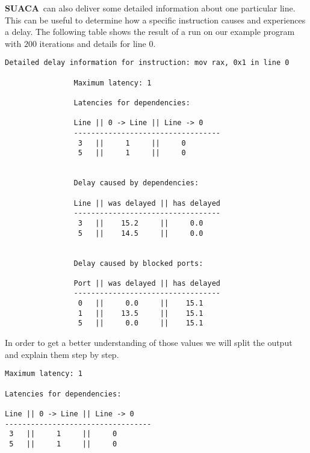 \documentclass[a4paper,12pt,titlepage, twoside]{report}
\newcommand{\suaca}{\textbf{SUACA}}
\begin{document}
\suaca\ can also deliver some detailed information about one particular line. This can be useful to determine how a specific instruction causes and experiences a delay. The following table shows the result of a run on our example program with $200$ iterations and details for line $0$.

\begin{mdframed}[backgroundcolor=light-gray, roundcorner=10pt,leftmargin=1, rightmargin=1, innerleftmargin=15, innertopmargin=15,innerbottommargin=15, outerlinewidth=1, linecolor=light-gray]
\begin{center}
\begin{BVerbatim}[fontsize=\scriptsize]
Detailed delay information for instruction: mov rax, 0x1 in line 0

                Maximum latency: 1
                
                Latencies for dependencies:
                
                Line || 0 -> Line || Line -> 0
                ----------------------------------
                 3   ||     1     ||     0
                 5   ||     1     ||     0
                
                
                Delay caused by dependencies:
                
                Line || was delayed || has delayed
                ----------------------------------
                 3   ||    15.2     ||     0.0
                 5   ||    14.5     ||     0.0
                
                
                Delay caused by blocked ports:
                
                Port || was delayed || has delayed
                ----------------------------------
                 0   ||     0.0     ||    15.1
                 1   ||    13.5     ||    15.1
                 5   ||     0.0     ||    15.1
\end{BVerbatim}
\end{center}
\end{mdframed}

In order to get a better understanding of those values we will split the output and explain them step by step.

\begin{mdframed}[backgroundcolor=light-gray, roundcorner=10pt,leftmargin=1, rightmargin=1, innerleftmargin=15, innertopmargin=15,innerbottommargin=15, outerlinewidth=1, linecolor=light-gray]
\begin{center}
\begin{BVerbatim}[fontsize=\scriptsize]
Maximum latency: 1

Latencies for dependencies:

Line || 0 -> Line || Line -> 0
----------------------------------
 3   ||     1     ||     0
 5   ||     1     ||     0
\end{BVerbatim}
\end{center}
\end{mdframed}
\end{document}
